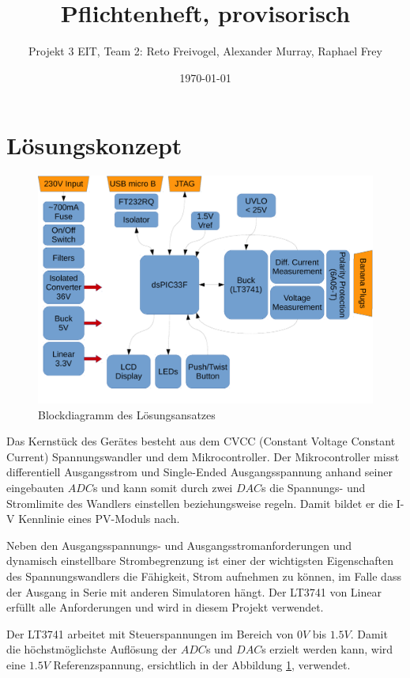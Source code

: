 \documentclass{article}
\title{Pflichtenheft, provisorisch}
\date{\today}
\author{Projekt 3 EIT, Team 2: Reto Freivogel, Alexander Murray, Raphael Frey}
\begin{document}
\maketitle

\section{L\"osungskonzept}
\begin{figure}[h!]
    \begin{centering}
    \includegraphics[width=.667\textwidth]{grob-blockdiagramm.pdf}
    \caption{Blockdiagramm des L\"osungsansatzes}
    \end{centering}
    \label{fig:grob-blockschaltbild}
\end{figure}

Das Kernst\"uck des Ger\"ates besteht  aus dem CVCC (Constant Voltage Constant
Current) Spannungswandler  und dem Mikrocontroller. Der  Mikrocontroller misst
differentiell Ausgangsstrom  und Single-Ended Ausgangsspannung  anhand seiner
eingebauten $ADC$s und  kann  somit   durch  zwei $DAC$s die  Spannungs-   und
Stromlimite  des  Wandlers einstellen  beziehungsweise regeln. Damit  bildet
er  die I-V  Kennlinie eines PV-Moduls nach.

Neben den Ausgangsspannungs- und Ausgangsstromanforderungen und dynamisch
einstellbare Strombegrenzung ist einer der wichtigsten Eigenschaften des
Spannungswandlers die F\"ahigkeit, Strom aufnehmen zu k\"onnen, im Falle dass
der Ausgang in Serie mit anderen Simulatoren h\"angt. Der LT3741 von Linear
erf\"ullt alle Anforderungen und wird in diesem Projekt verwendet.

Der LT3741 arbeitet mit Steuerspannungen im Bereich von $0V$ bis $1.5V$. Damit
die h\"ochstm\"oglichste Aufl\"osung der $ADC$s und $DAC$s erzielt werden kann,
wird eine $1.5V$ Referenzspannung, ersichtlich in der Abbildung
\ref{fig:grob-blockschaltbild}, verwendet.
\end{document}
